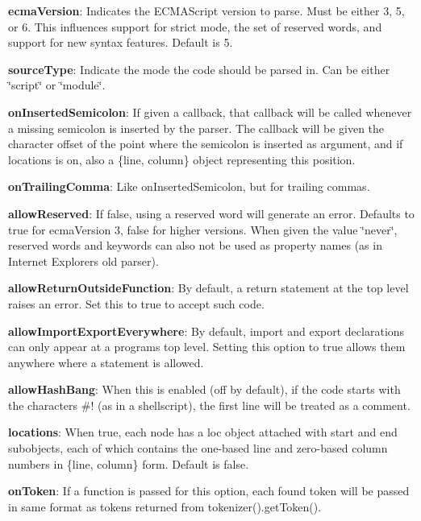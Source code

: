 \begin{DoxyItemize}
\item {\bfseries ecma\+Version}\+: Indicates the E\+C\+M\+A\+Script version to parse. Must be either 3, 5, or 6. This influences support for strict mode, the set of reserved words, and support for new syntax features. Default is 5.
\item {\bfseries source\+Type}\+: Indicate the mode the code should be parsed in. Can be either {\ttfamily \char`\"{}script\char`\"{}} or {\ttfamily \char`\"{}module\char`\"{}}.
\item {\bfseries on\+Inserted\+Semicolon}\+: If given a callback, that callback will be called whenever a missing semicolon is inserted by the parser. The callback will be given the character offset of the point where the semicolon is inserted as argument, and if {\ttfamily locations} is on, also a {\ttfamily \{line, column\}} object representing this position.
\item {\bfseries on\+Trailing\+Comma}\+: Like {\ttfamily on\+Inserted\+Semicolon}, but for trailing commas.
\item {\bfseries allow\+Reserved}\+: If {\ttfamily false}, using a reserved word will generate an error. Defaults to {\ttfamily true} for {\ttfamily ecma\+Version} 3, {\ttfamily false} for higher versions. When given the value {\ttfamily \char`\"{}never\char`\"{}}, reserved words and keywords can also not be used as property names (as in Internet Explorer\textquotesingle{}s old parser).
\item {\bfseries allow\+Return\+Outside\+Function}\+: By default, a return statement at the top level raises an error. Set this to {\ttfamily true} to accept such code.
\item {\bfseries allow\+Import\+Export\+Everywhere}\+: By default, {\ttfamily import} and {\ttfamily export} declarations can only appear at a program\textquotesingle{}s top level. Setting this option to {\ttfamily true} allows them anywhere where a statement is allowed.
\item {\bfseries allow\+Hash\+Bang}\+: When this is enabled (off by default), if the code starts with the characters {\ttfamily \#!} (as in a shellscript), the first line will be treated as a comment.
\item {\bfseries locations}\+: When {\ttfamily true}, each node has a {\ttfamily loc} object attached with {\ttfamily start} and {\ttfamily end} subobjects, each of which contains the one-\/based line and zero-\/based column numbers in {\ttfamily \{line, column\}} form. Default is {\ttfamily false}.
\item {\bfseries on\+Token}\+: If a function is passed for this option, each found token will be passed in same format as tokens returned from {\ttfamily tokenizer().get\+Token()}.


\end{DoxyItemize}
